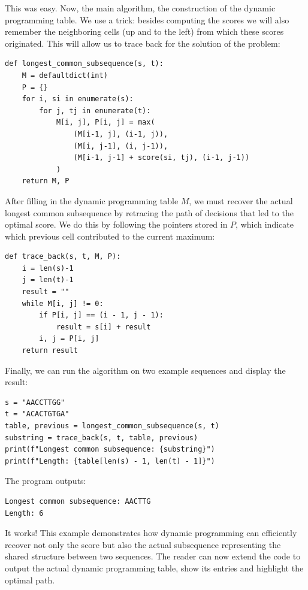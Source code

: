 This was easy. Now, the main algorithm, the construction of the dynamic programming table. We use a trick: besides computing the scores we will also remember the neighboring cells (up and to the left) from which these scores originated. This will allow us to trace back for the solution of the problem:

\vspace*{3mm}
\begin{lstlisting}
def longest_common_subsequence(s, t):
    M = defaultdict(int)
    P = {}
    for i, si in enumerate(s):
        for j, tj in enumerate(t):
            M[i, j], P[i, j] = max(
                (M[i-1, j], (i-1, j)),
                (M[i, j-1], (i, j-1)),
                (M[i-1, j-1] + score(si, tj), (i-1, j-1))
            )
    return M, P
\end{lstlisting}

After filling in the dynamic programming table $M$, we must recover the actual longest common subsequence by retracing the path of decisions that led to the optimal score. We do this by following the pointers stored in $P$, which indicate which previous cell contributed to the current maximum:

\vspace*{3mm}
\begin{lstlisting}
def trace_back(s, t, M, P):
    i = len(s)-1
    j = len(t)-1
    result = ""
    while M[i, j] != 0:
        if P[i, j] == (i - 1, j - 1):
            result = s[i] + result
        i, j = P[i, j]
    return result
\end{lstlisting}

Finally, we can run the algorithm on two example sequences and display the result:

\vspace*{3mm}
\begin{lstlisting}
s = "AACCTTGG"
t = "ACACTGTGA"
table, previous = longest_common_subsequence(s, t)
substring = trace_back(s, t, table, previous)
print(f"Longest common subsequence: {substring}")
print(f"Length: {table[len(s) - 1, len(t) - 1]}")

\end{lstlisting}

The program outputs:

\vspace*{3mm}
\begin{lstlisting}
Longest common subsequence: AACTTG
Length: 6
\end{lstlisting}

It works! This example demonstrates how dynamic programming can efficiently recover not only the score but also the actual subsequence representing the shared structure between two sequences. The reader can now extend the code to output the actual dynamic programming table, show its entries and highlight the optimal path.

